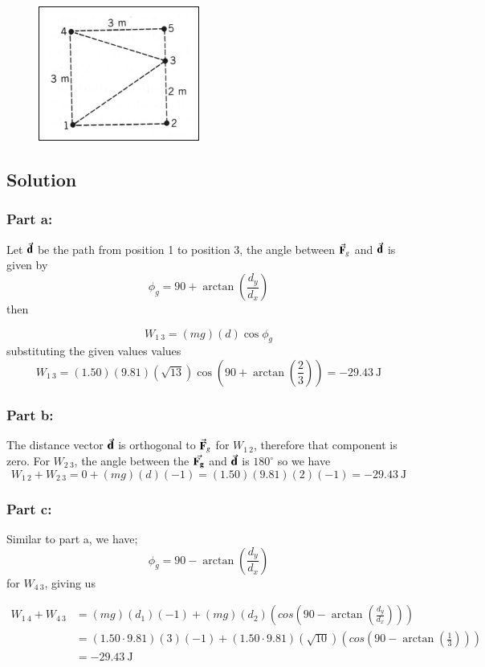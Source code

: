 \documentclass{article}
\begin{document}
\begin{figure}[ht]
    \centering
    \includegraphics[scale=.5]{drawing-1.png}
\end{figure}

\subsection*{Solution}
\subsubsection*{Part a:}
Let $\va{d}$ be the path from position 1 to position 3, the angle between $\va{F}_g$ and $\va{d}$ is given by
\[
	\phi_g = 90 + \arctan\left(\frac{d_y}{d_x}\right)
\]
then

\[
	W_{1\ 3} = (mg)(d)\cos \phi_g
\]
substituting the given values values
\[
	W_{1\ 3} = (1.50)(9.81)(\sqrt{13}) \cos \left( 90 + \arctan \left( \frac{2}{3} \right) \right) = \boxed{-29.43\ \text{J}}
\]

\subsubsection*{Part b:}
The distance vector $\va{d}$ is orthogonal to $\va{F}_g$ for $W_{1\ 2}$, therefore that component is zero. For $W_{2\ 3}$, the angle between the $\va{F_g}$ and $\va{d}$ is $180^\circ$ so we have
\[
	W_{1\ 2} + W_{2\ 3} = 0 + (mg)(d)(-1) = (1.50)(9.81)(2)(-1) = \boxed{-29.43\ \text{J}}
\]

\subsubsection*{Part c:}
Similar to part a, we have;
\[
	\phi_g = 90 - \arctan\left(\frac{d_y}{d_x}\right)
\]
for $W_{4\ 3}$, giving us

\begin{align*}
	W_{1\ 4} + W_{4\ 3} &= (mg)(d_1)(-1) + (mg)(d_2)\left(cos\left( 90 - \arctan\left(\frac{d_y}{d_x}\right) \right) \right) \\
			    &= (1.50 \cdot 9.81)(3)(-1) + (1.50 \cdot 9.81)(\sqrt{10})\left(cos\left( 90 - \arctan\left(\frac{1}{3}\right) \right) \right) \\
			    &= \boxed{-29.43\ \text{J}}
\end{align*}
\end{document}
